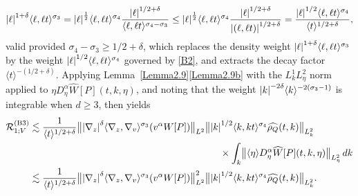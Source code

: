 \documentclass[JEP,XML,SOM,Unicode]{cedram}
\newcommand{\bnorm}[1]{\bigl\|#1\bigr\|}
\theoremstyle{plain}
\theoremstyle{remark}
\newcommand{\ak}{\abs{k}}
\newcommand{\half}{\frac{1}{2}}
\newcommand{\jb}[1]{\langle#1\rangle}
\begin{document}
\begin{align*}
\abs{\ell }^{1+\delta}\jb{\ell ,\ell t}^{\sigma_3}=\abs{\ell }^{\half}\jb{\ell ,\ell t}^{\sigma_4}\frac{\abs{\ell }^{1/2+\delta}}{\jb{\ell ,\ell t}^{\sigma_4-\sigma_3}}\leq\abs{\ell }^{\half}\jb{\ell ,\ell t}^{\sigma_4}\frac{\abs{\ell }^{1/2+\delta}}{\abs{(\ell ,\ell t)}^{1/2+\delta}}=\frac{\abs{\ell }^{1/2}\jb{\ell ,\ell t}^{\sigma_4}}{\jb{t}^{1/2+\delta}},
\end{align*}
valid provided $\sigma_4-\sigma_3\geq 1/2+\delta$, which replaces the density weight $\abs{\ell}^{1+\delta}\jb{\ell,\ell t}^{\sigma_3}$ by the weight $\abs{\ell}^{1/2}\jb{\ell,\ell t}^{\sigma_4}$ governed by \eqref{B2}, and extracts the decay factor $\jb{t}^{-(1/2+\delta)}$. Applying Lemma~\ref{Lemma2.9}\eqref{Lemma2.9b} with the $L^1_kL^2_\eta$ norm applied to $\eta D^\alpha_\eta \widehat{W}[P](t,k,\eta)$, and noting that the weight $\abs{k}^{-2\delta}\jb{k}^{-2(\sigma_3-1)}$ is integrable when $d\geq 3$, then yields
\begin{align*}
\mathcal{R}_{1;V}^{\mathrm{(B3)}}&\lesssim\frac{1}{\jb{t}^{1/2+\delta}}\bnorm{\abs{\nabla_z}^\delta\jb{\nabla_z,\nabla_v}^{\sigma_3}(v^\alpha W[P])}_{L^2}\bnorm{\ak^{1/2}\jb{k,kt}^{\sigma_4}\widehat{\rho_Q}(t,k)}_{L^2_k}\\
&\hspace{7cm}\times\int_k\bnorm{\jb{\eta}D^\alpha_\eta \widehat{W}[P](t,k,\eta)}_{L^2_\eta}\,dk\\
&\lesssim\frac{1}{\jb{t}^{1/2+\delta}}\bnorm{\abs{\nabla_z}^\delta\jb{\nabla_z,\nabla_v}^{\sigma_3}(v^\alpha W[P])}_{L^2}^2\bnorm{\ak^{1/2}\jb{k,kt}^{\sigma_4}\widehat{\rho_Q}(t,k)}_{L^2_k}.
\end{align*}
\end{document}
